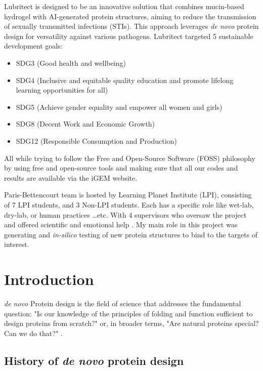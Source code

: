 \documentclass[11pt,a4paper]{article}
\begin{document}
Lubritect is designed to be an innovative solution that combines 
mucin-based hydrogel with AI-generated protein structures, aiming to 
reduce the transmission of sexually transmitted infections (STIs). This 
approach leverages \emph{de novo} protein design for versatility against 
various pathogens. 
Lubritect targeted 5
sustainable development goals:
\begin{itemize}
    \item SDG3 (Good health and wellbeing)
    \item SDG4 (Inclusive and equitable quality education and promote lifelong learning opportunities for all)
    \item SDG5 (Achieve gender equality and empower all women and girls)
    \item SDG8 (Decent Work and Economic Growth)
    \item SDG12 (Responsible Consumption and Production)
\end{itemize}

All while trying to follow the Free and Open-Source Software (FOSS) philosophy \cite{gun_foss} by using free and open-source tools and making sure that all our codes and results are available via the iGEM website.

Paris-Bettencourt team is hosted by Learning Planet Institute (LPI),
consisting of 7 LPI students, and 3 Non-LPI students.
Each has a specific role like wet-lab, dry-lab, or human practices \ldots etc. With 4 supervisors who oversaw the project and offered scientific and emotional help \cite{paris_bettencourt_team}.
My main role in this project was generating and \emph{in-silico} testing of new protein structures to bind to the targets of interest.


\section{Introduction}

\emph{de novo} Protein design is the field of science that addresses the 
fundamental question: "Is our knowledge of the principles of folding 
and function sufficient to design proteins from scratch?" 
\cite{korendovych2020novo} or, in broader terms, "Are natural proteins 
special? Can we do that?" \cite{hecht2018natural}.

\subsection{History of \emph{de novo} protein design}
\end{document}
